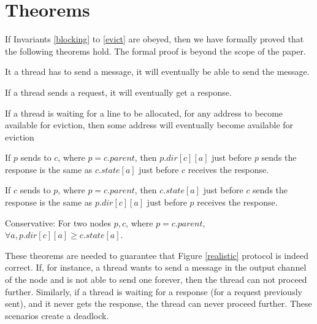 \section{Theorems}
\label{sec:theorems}

If Invariants \ref{blocking} to \ref{evict} are obeyed, then we have formally
proved that the following theorems hold. The formal proof is beyond the scope of
the paper.

\begin{theorem}
It a thread has to send a message, it will eventually be able to send the
message.
\label{canSend}
\end{theorem}

\begin{theorem}
If a thread sends a request, it will eventually get a response.
\label{willRecv}
\end{theorem}

\begin{theorem}
If a thread is waiting for a line to be allocated, \ie for any address to become
available for eviction, then some address will eventually become available for
eviction
\label{evictDead}
\end{theorem}

\begin{theorem}
If $p$ sends  to $c$, where $p = c.parent$, then $p.dir[c][a]$
just before $p$ sends the response is the same as $c.state[a]$ just before $c$
receives the response.
\label{pcSame}
\end{theorem}

\begin{theorem}
If $c$ sends  to $p$, where $p = c.parent$, then $c.state[a]$
just before $c$ sends the response is the same as $p.dir[c][a]$ just before $p$
receives the response.
\label{cpSame}
\end{theorem}

\begin{theorem}
Conservative: For two nodes $p, c$, where $p = c.parent$, $\forall a,
p.dir[c][a] \ge c.state[a]$.
\label{conservative}
\end{theorem}

These theorems are needed to guarantee that Figure \ref{realistic} protocol is
indeed correct. If, for instance, a thread wants to send a message in the output
channel of the node and is not able to send one forever, then the thread can not
proceed further. Similarly, if a thread is waiting for a response (for a request
previously sent), and it never gets the response, the thread can never proceed
further. These scenarios create a deadlock.

